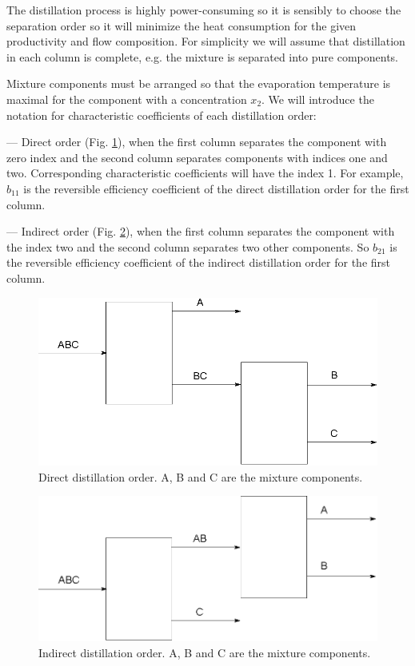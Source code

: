\documentclass[12pt]{article}
\begin{document}
The distillation process is highly power-consuming so it is sensibly to choose the separation order so it will minimize the heat consumption for the given productivity and flow composition. For simplicity we will assume that distillation in each column is complete, e.g. the mixture is separated into pure components.

Mixture components must be arranged so that the evaporation temperature is maximal for the component with a concentration $x_2$. We will introduce the notation for characteristic coefficients of each distillation order:

--- Direct order (Fig. \ref{fig:direct}), when the first column separates the component with zero index and the second column separates components with indices one and two. Corresponding characteristic coefficients will have the index 1. For example, $b_{11}$ is the reversible efficiency coefficient of the direct distillation order for the first column.

--- Indirect order (Fig. \ref{fig:indirect}), when the first column separates the component with the index two and the second column separates two other components. So $b_{21}$ is the reversible efficiency coefficient of the indirect distillation order for the first column.

\begin{figure}[bth]
\centering
\includegraphics{direct.eps}
\caption{Direct distillation order. A, B and C are the mixture components.}
\label{fig:direct}
\end{figure}

\begin{figure}[bth]
\centering
\includegraphics{indirect.eps}
\caption{Indirect distillation order. A, B and C are the mixture components.}
\label{fig:indirect}
\end{figure}
\end{document}
